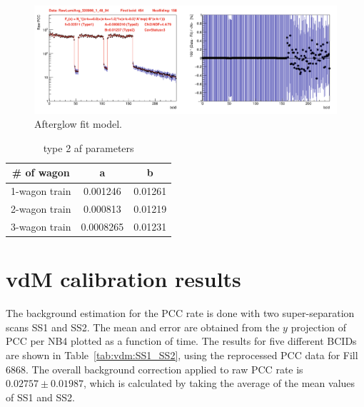 \begin{figure}[!htp]
\centering
\includegraphics[width=1\textwidth]{ashish_thesis/3wagon_fit.png}
\caption[]{%
  Afterglow fit model.
}
\label{fig:af_fit}
\end{figure}








\begin{table}
  \centering
  \begin{tabular}{ccc}
    \textbf{\# of wagon} & \textbf{a} & \textbf{b} \\
     \hline
   1-wagon train  & 0.001246  & 0.01261 \\
   2-wagon train  & 0.000813 &  0.01219\\
   3-wagon train  & 0.0008265 &  0.01231\\
  \end{tabular}
  \caption{type 2  af parameters}
\end{table}





\section{vdM calibration results}

The background estimation for the PCC rate is done with two super-separation scans SS1 and SS2. The mean and error are obtained from the $y$ projection of PCC per NB4 plotted as a function of time. The results for five different BCIDs are shown in Table~\ref{tab:vdm:SS1_SS2}, using the reprocessed PCC data for Fill 6868. The overall background correction applied to raw PCC rate is $0.02757\pm0.01987$, which is calculated by taking the average of the mean values of SS1 and SS2.

